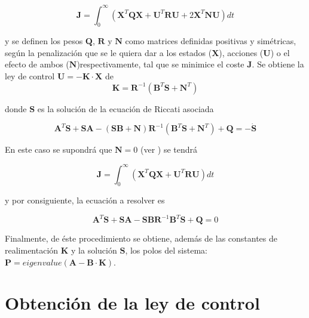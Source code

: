 \documentclass[twoside,11pt]{book}
\begin{document}
\begin{equation}
\mathbf{J} =\int^{\infty}_{0} \left( \mathbf{X}^{T} \mathbf{Q}\pmb{X} + \mathbf{U}^{T} \mathbf{R}\mathbf{U} + 2\mathbf{X}^{T} \mathbf{N}\mathbf{U} \right) dt
\end{equation}

y se definen los pesos $\mathbf{Q}$, $\mathbf{R}$ y $\mathbf{N}$ como matrices definidas positivas y simétricas, según la penalización que se le quiera dar a los estados ($\mathbf{X}$), acciones ($\mathbf{U}$) o el efecto de ambos ($\mathbf{N}$)respectivamente, tal que se minimice el coste $\mathbf{J}$. Se obtiene la ley de control $\mathbf{U}=-\mathbf{K} \cdot \mathbf{X}$ de 
\begin{equation}
\mathbf{K}=\mathbf{R}^{-1} \left( \mathbf{B}^{T} \mathbf{S} + \mathbf{N}^{T} \right) 
\end{equation}

donde $\mathbf{S}$ es la solución de la ecuación de Riccati asociada 

\begin{equation}
\mathbf{A}^{T}\mathbf{S} + \mathbf{S}\mathbf{A} - \left( \mathbf{S}\pmb{B}+\mathbf{N} \right) \mathbf{R}^{-1} \left( \mathbf{B}^{T} \mathbf{S} + \mathbf{N}^{T} \right) + \mathbf{Q} = - \dot{\mathbf{S}}
\end{equation}

En este caso se supondrá que $\mathbf{N}=0$ (ver \cite{LQR_Matlab}) se tendrá

\begin{equation}
\mathbf{J} =\int^{\infty}_{0} \left( \mathbf{X}^{T} \mathbf{Q}\mathbf{X} + \mathbf{U}^{T}\mathbf{R}\mathbf{U} \right) dt
\end{equation}

y por consiguiente, la ecuación a resolver es

\begin{equation}
\mathbf{A}^{T}\mathbf{S} + \mathbf{S}\mathbf{A} - \mathbf{S}\mathbf{B} \mathbf{R}^{-1} \mathbf{B}^{T} \mathbf{S} + \mathbf{Q} = 0
\end{equation}

Finalmente, de éste procedimiento se obtiene, además de las constantes de realimentación $\mathbf{K}$ y la solución $\mathbf{S}$, los polos del sistema: $\mathbf{P}=eigenvalue( \mathbf{A} - \mathbf{B} \cdot \mathbf{K})$.


\section{Obtención de la ley de control}
\end{document}
